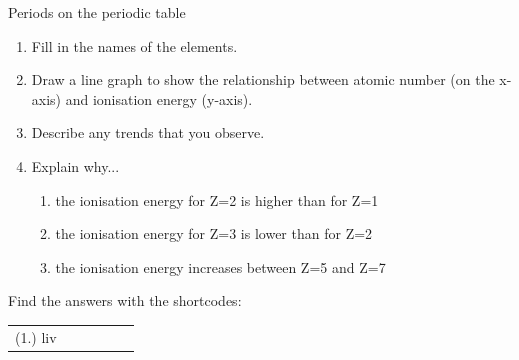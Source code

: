 \begin{exercises}{Periods on the periodic table}
\begin{enumerate}[noitemsep, label=\textbf{\arabic*}. ]
\begin{enumerate}[noitemsep, label=\textbf{\alph*}. ]
 \item Fill in the names of the elements.
\item{Draw a line graph to show the relationship between atomic number (on the x-axis) and ionisation energy (y-axis).}
\item{Describe any trends that you observe.}
\item{Explain why...
	\begin{enumerate}[noitemsep, label=\textbf{\roman*}. ]
	\item{the ionisation energy for Z=2 is higher than for Z=1}
	\item{the ionisation energy for Z=3 is lower than for Z=2}
	\item{the ionisation energy increases between Z=5 and Z=7}
	\end{enumerate}
}
\end{enumerate}
\end{enumerate}
      \label{m38757*secfhsst!!!underscore!!!id936}
\par {} Find the answers with the shortcodes:
 \par \begin{tabular}[h]{cccccc}
 (1.) liv  & \end{tabular}
\end{exercises}
